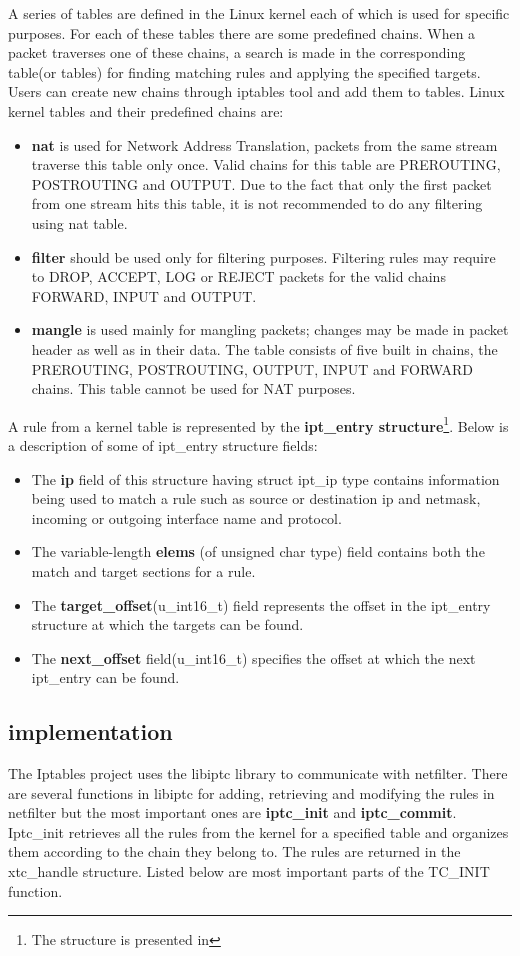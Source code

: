 {{A series of tables are defined in the Linux kernel each of which is used for specific purposes. For each of 
these tables there are some predefined chains. When a packet traverses one of these chains, a search is made 
in the corresponding table(or tables) for finding matching rules and applying the specified targets. Users can 
create new chains through iptables tool and add them to tables.
Linux kernel tables and their predefined chains are:       
\begin{itemize}
\item {\bf nat} is used for Network Address Translation, packets from the same stream traverse this table only 
once. Valid chains for this table are PREROUTING, POSTROUTING and OUTPUT. Due to the fact that only the first 
packet from one stream hits this table, it is not recommended to do any filtering using nat table.
\item {\bf filter} should be used only for filtering purposes. Filtering rules may require to DROP, ACCEPT, LOG or 
REJECT packets for the valid chains FORWARD, INPUT and OUTPUT.
\item {\bf mangle} is used mainly for mangling packets; changes may be made in packet header as well as in their data. 
The table consists of five built in chains, the PREROUTING, POSTROUTING, OUTPUT, INPUT and FORWARD chains. This table cannot 
be used for NAT purposes.
\end{itemize}
A rule from a kernel table is represented by the \textbf{ipt_entry structure}\footnote{The structure is presented in }. 
Below is a description of some of ipt_entry structure fields:
\begin{itemize}
\item The \textbf{ip} field of this structure having struct ipt_ip type contains information being used to match a rule such as source or destination ip and netmask, incoming or outgoing interface name and protocol. \item The variable-length \textbf{elems} (of unsigned char type) field contains both the match and target sections for a rule. 
\item The \textbf{target_offset}(u_int16_t) field represents the offset in the ipt_entry structure at which the targets can be found. 
\item The \textbf{next_offset} field(u_int16_t) specifies the offset at which the next ipt_entry can be found.   
\end{itemize}

\subsection{\project implementation}
\label{sub-sec:nat-lklnet}
The Iptables project uses the libiptc library to communicate with netfilter. There are several functions in libiptc for adding, retrieving and modifying the rules in netfilter but the most important ones are \textbf{iptc_init} and \textbf{iptc_commit}. 
Iptc_init retrieves all the rules from the kernel for a specified table and organizes them according to the chain they belong to. The rules are returned in the xtc_handle structure. Listed below are most important parts of the TC_INIT function.

}}
